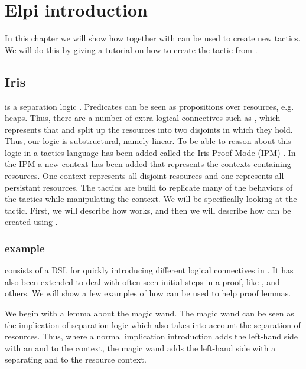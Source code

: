 \documentclass[thesis.tex]{subfiles}
\begin{document}
\chapter{Elpi introduction}
In this chapter we will show how \elpi together with \ce can be used to create new tactics. We will do this by giving a tutorial on how to create the  tactic from \iris.

\section[Iris iIntros]{Iris }
\iris is a separation logic \cite*{jungIrisMonoidsInvariants2015a,jungHigherorderGhostState2016,krebbersEssenceHigherOrderConcurrent2017,jungIrisGroundModular2018}. Predicates can be seen as propositions over resources, e.g. heaps. Thus, there are a number of extra logical connectives such as , which represents that  and  split up the resources into two disjoints in which they hold. Thus, our logic is substructural, namely linear. To be able to reason about this logic in \coq a tactics language has been added called the Iris Proof Mode (IPM) \cite*{krebbersInteractiveProofsHigherorder2017,krebbersMoSeLGeneralExtensible2018}. In the IPM a new context has been added that represents the contexts containing resources. One context represents all disjoint resources and one represents all persistant resources. The tactics are build to replicate many of the behaviors of the \coq tactics while manipulating the \iris context. We will be specifically looking at the  tactic. First, we will describe how  works, and then we will describe how  can be created using \elpi.

\subsection[iIntros example]{ example}
 consists of a DSL for quickly introducing different logical connectives in \iris. It has also been extended to deal with often seen initial steps in a proof, like ,  and others. We will show a few examples of how  can be used to help proof lemmas.

We begin with a lemma about the magic wand. The magic wand can be seen as the implication of separation logic which also takes into account the separation of resources. Thus, where a normal implication introduction adds the left-hand side with an and to the context, the magic wand adds the left-hand side with a separating and to the resource context.
\end{document}
